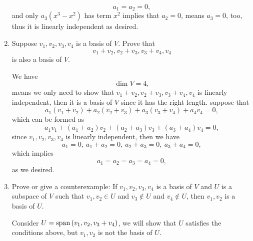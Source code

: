 \begin{enumerate}
\begin{solution}
            \[ a_1 = a_2 =0,\]
            and only $a_3(x^3-x^2)$ has term $x^2$ implies that $a_2=0$, means $a_3 =0$, too, thus 
            it is linearly independent as desired.
        \end{solution}
    \item Suppose $v_1, v_2, v_3, v_4$ is a basis of $V$. Prove that 
        \[ v_1 + v_2, v_2+v_3, v_3+v_4, v_4\]
        is also a basis of $V$.
        \begin{solution}
            We have 
            \[ \dim{V} = 4,\]
            means we only need to show that $v_1 + v_2, v_2+v_3, v_3+v_4, v_4$ is linearly independent, then it is a basis of $V$ since it has the right length.
            suppose that 
            \[ a_1(v_1+v_2) + a_2(v_2 + v_3) + a_3(v_3+v_4) + a_4v_4 = 0,\]
            which can be formed as 
            \[ a_1v_1 + (a_1 + a_2)v_2 + (a_2 + a_3)v_3 + (a_3 + a_4)v_4 = 0,\]
            since $v_1, v_2, v_3, v_4$ is linearly independent, then we have 
            \[ a_1 = 0, \ a_1 + a_2 =0, \ a_2 + a_3 = 0, \ a_3 + a_4 = 0,\]
            which implies 
            \[ a_1 = a_2 = a_3 = a_4 = 0,\]
            as we desired.
        \end{solution}
    \item Prove or give a counterexample: If $v_1, v_2, v_3, v_4$ is a basis of $V$ and $U$ is a subspace of $V$ such that 
        $v_1,v_2 \in U$ and $v_3 \notin U$ and $v_4 \notin U$, then $v_1, v_2$ is a basis of $U$.
        \begin{solution}
            Consider $U = \text{span}\left(v_1, v_2, v_3 + v_4\right)$, we will show that $U$ satisfies the conditions above, but $v_1,v_2$ is not the basis of $U$.


\end{solution}
\end{enumerate}
